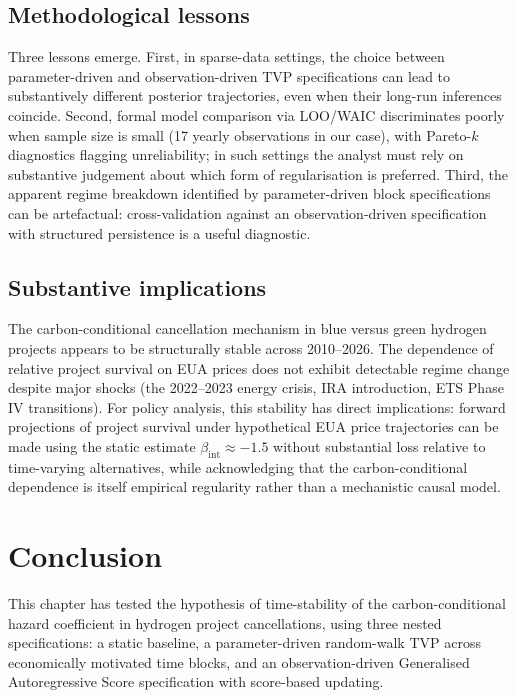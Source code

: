 \documentclass[11pt,a4paper]{article}
\newcommand{\bint}{\beta_{\mathrm{int}}}
\begin{document}
\subsection{Methodological lessons}

Three lessons emerge. First, in sparse-data settings, the choice between parameter-driven and observation-driven TVP specifications can lead to substantively different posterior trajectories, even when their long-run inferences coincide. Second, formal model comparison via LOO/WAIC discriminates poorly when sample size is small (17 yearly observations in our case), with Pareto-$k$ diagnostics flagging unreliability; in such settings the analyst must rely on substantive judgement about which form of regularisation is preferred. Third, the apparent regime breakdown identified by parameter-driven block specifications can be artefactual: cross-validation against an observation-driven specification with structured persistence is a useful diagnostic.

\subsection{Substantive implications}

The carbon-conditional cancellation mechanism in blue versus green hydrogen projects appears to be structurally stable across 2010--2026. The dependence of relative project survival on EUA prices does not exhibit detectable regime change despite major shocks (the 2022--2023 energy crisis, IRA introduction, ETS Phase IV transitions). For policy analysis, this stability has direct implications: forward projections of project survival under hypothetical EUA price trajectories can be made using the static estimate $\bint \approx -1.5$ without substantial loss relative to time-varying alternatives, while acknowledging that the carbon-conditional dependence is itself empirical regularity rather than a mechanistic causal model.

\section{Conclusion}
\label{sec:ch7-conclusion}

This chapter has tested the hypothesis of time-stability of the carbon-conditional hazard coefficient in hydrogen project cancellations, using three nested specifications: a static baseline, a parameter-driven random-walk TVP across economically motivated time blocks, and an observation-driven Generalised Autoregressive Score specification with score-based updating.
\end{document}
